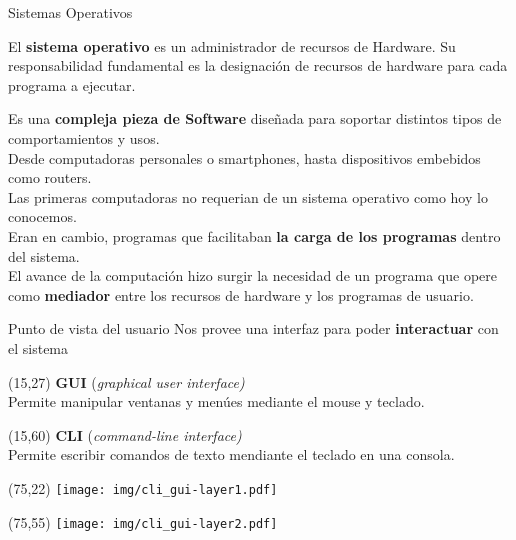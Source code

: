 \documentclass[aspectratio=169]{beamer}
\begin{document}
\begin{frame}{Sistemas Operativos}
    \vspace{0.7cm}
    \begin{tcolorbox}[width=\textwidth,colback={verdeuca!30},title={}]
    El \textbf{sistema operativo} es un administrador de recursos de Hardware.
    Su responsabilidad fundamental es la designación de recursos de hardware para cada programa a ejecutar.
    \end{tcolorbox}
    \small
    \bigskip
    \pause
    Es una \textcolor{verdeuca}{\textbf{compleja pieza de Software}} diseñada para soportar distintos tipos de comportamientos y usos.\\
    Desde computadoras personales o smartphones, hasta dispositivos embebidos como routers.\\
    \bigskip
    \pause
    Las primeras computadoras no requerian de un sistema operativo como hoy lo conocemos.\\
    Eran en cambio, programas que facilitaban \textcolor{verdeuca}{\textbf{la carga de los programas}} dentro del sistema.\\
    \bigskip
    El avance de la computación hizo surgir la necesidad de un programa que opere como \textcolor{verdeuca}{\textbf{mediador}} entre los recursos de hardware y los programas de usuario.
\end{frame}

\begin{frame}[t]{Punto de vista del usuario}
    Nos provee una interfaz para poder \textcolor{verdeuca}{\textbf{interactuar}} con el sistema
    \begin{textblock}{50}(15,27)
    \normalsize \textbf{GUI} (\emph{graphical user interface)}\\
    \small Permite manipular ventanas y menúes mediante el mouse y teclado.
    \end{textblock}
    \begin{textblock}{50}(15,60)
    \normalsize \textbf{CLI} (\emph{command-line interface)}\\
    \small Permite escribir comandos de texto mendiante el teclado en una consola.
    \end{textblock}
    \begin{textblock}{50}(75,22)
    \texttt{[image: img/cli\_gui-layer1.pdf]}
    \end{textblock}
    \begin{textblock}{50}(75,55)
    \texttt{[image: img/cli\_gui-layer2.pdf]}
    \end{textblock}
\end{frame}
\end{document}
